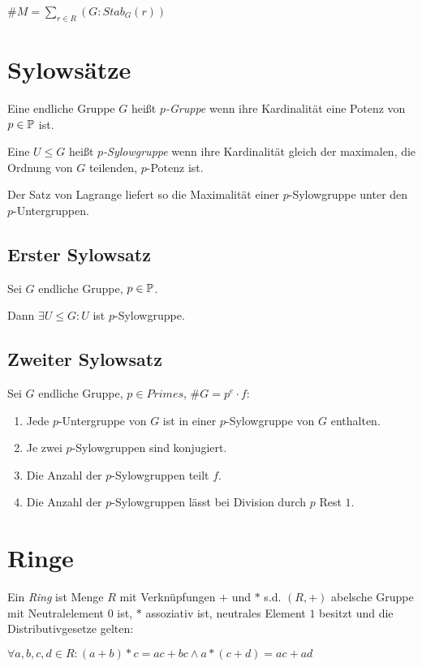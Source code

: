 $\#M = \sum_{r \in R} (G : Stab_G(r))$

\section*{Sylowsätze}

Eine endliche Gruppe $G$ heißt \emph{$p$-Gruppe} wenn ihre Kardinalität eine Potenz von $p \in \mathbb{P}$ ist.

Eine $U \leq G$ heißt \emph{$p$-Sylowgruppe} wenn ihre Kardinalität gleich der maximalen, die Ordnung von $G$ teilenden, $p$-Potenz ist.

Der Satz von Lagrange liefert so die Maximalität einer $p$-Sylowgruppe unter den $p$-Untergruppen.

\subsection*{Erster Sylowsatz}

Sei $G$ endliche Gruppe, $p \in \mathbb{P}$.

Dann $\exists U \leq G : U$ ist $p$-Sylowgruppe.

\subsection*{Zweiter Sylowsatz}

Sei $G$ endliche Gruppe, $p \in Primes$, $\#G = p^e \cdot f$:

\begin{enumerate}[label=(\alph*)]
	\item Jede $p$-Untergruppe von $G$ ist in einer $p$-Sylowgruppe von $G$ enthalten.
	\item Je zwei $p$-Sylowgruppen sind konjugiert.
	\item Die Anzahl der $p$-Sylowgruppen teilt $f$.
	\item Die Anzahl der $p$-Sylowgruppen lässt bei Division durch $p$ Rest $1$.
\end{enumerate}

\section*{Ringe}

Ein \emph{Ring} ist Menge $R$ mit Verknüpfungen $+$ und $*$ s.d. $(R,+)$ abelsche Gruppe mit Neutralelement $0$ ist, $*$ assoziativ ist, neutrales Element $1$ besitzt und die Distributivgesetze gelten:

$\forall a, b, c, d \in R : (a+b)*c = ac+bc \land a*(c+d) = ac + ad$

